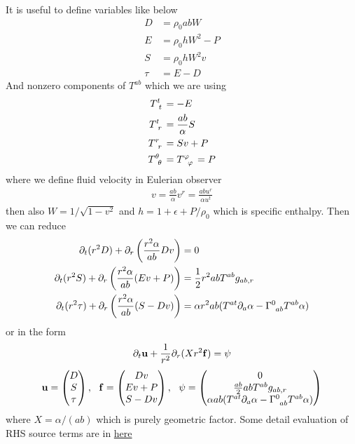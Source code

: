 \documentclass[prd]{revtex4}
\begin{document}
It is useful to define variables like below
\begin{align}
D &= \rho_0 ab W  \\
E &= \rho_0 h  W^2 -P \\
S &= \rho_0 h W^2 v\\
\tau &= E-D
\end{align}
And nonzero components of $T^{ab}$ which we are using
\begin{align}
T\indices{^t_t} &= -E \\
T\indices{^t_r} &= \frac{ab}{\alpha} S \\
T\indices{^r_r} &=Sv+P\\
T\indices{^\theta_\theta}&=T\indices{^\varphi_\varphi}=P
\end{align}
where we define fluid velocity in Eulerian observer
\begin{align}
v = \frac{ab}{\alpha} v^r = \frac{ab u^r}{\alpha u^t}
\end{align}
then also $W=1 / \sqrt{1-v^2}$ and $h=1+\epsilon+P/\rho_0$ which is specific enthalpy.  Then we can reduce
\begin{align}
\partial_t ( r^2 D) + \partial_r \left(\frac{r^2\alpha}{ab}D v\right) &= 0 \\
\partial_t (r^2 S) + \partial_r \left( \frac{r^2 \alpha}{ab}( E v + P)\right) &= \frac{1}{2} r^2 a b T^{ab} g_{ab,r} \\
\partial_t ( r^2\tau) + \partial_r\left(\frac{r^2\alpha}{ab}(S - D v)\right) &= \alpha r^2 ab (T^{at} \partial_a \alpha - \Gamma\indices{^0_{ab}} T^{ab} \alpha )
\end{align}
or in the form
\begin{align}
\partial_t {\bf u} + \frac{1}{r^2} \partial_r (X r^2 {\bf f}) = \psi
\end{align}
\begin{align}
{\bf u} = 
\begin{pmatrix}
D \\
S \\
\tau
\end{pmatrix}, \,\,\,\,
{\bf f} = 
\begin{pmatrix}
Dv \\
Ev + P \\
S - Dv
\end{pmatrix}, \,\,\,\,
{\bf \psi} = 
\begin{pmatrix}
0 \\
\frac{ab}{2} a b T^{ab} g_{ab,r} \\
\alpha ab (T^{at} \partial_a \alpha - \Gamma\indices{^0_{ab}} T^{ab} \alpha )
\end{pmatrix}
\end{align}
where $X= \alpha / (ab)$ which is purely geometric factor. Some detail evaluation of RHS source terms are in \href{https://github.com/hlim88/PBH-NS/tree/master/tools}{here}
\end{document}
